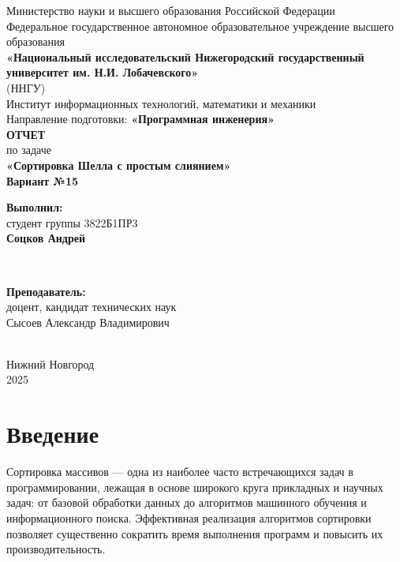 \documentclass[12pt]{article}
\begin{document}
\begin{titlepage}
    \centering
    \large
    Министерство науки и высшего образования Российской Федерации\\[0.5cm]
    Федеральное государственное автономное образовательное учреждение высшего образования\\[0.5cm]
    \textbf{«Национальный исследовательский Нижегородский государственный университет им. Н.И. Лобачевского»}\\
    (ННГУ)\\[1cm]
    Институт информационных технологий, математики и механики\\[0.5cm]
    Направление подготовки: \textbf{«Программная инженерия»}\\[2cm]

    \vfill
    {\LARGE \textbf{ОТЧЕТ}}\\[0.5cm]
    {\Large по задаче}\\[0.5cm]
    {\LARGE \textbf{«Сортировка Шелла с простым слиянием»}}\\[0.5cm]
    {\Large \textbf{Вариант №15}}\\[2.5cm]

    \hfill\parbox{0.5\textwidth}{
        \textbf{Выполнил:} \\
        студент группы 3822Б1ПР3 \\
        \textbf{Соцков Андрей}
    }\\[0.5cm]

    \hfill\parbox{0.5\textwidth}{
        \textbf{Преподаватель:} \\
        доцент, кандидат технических наук \\
        Сысоев Александр Владимирович
    }\\[2cm]

    Нижний Новгород\\
    2025
\end{titlepage}


\thispagestyle{empty}
\clearpage
{} 
\setcounter{page}{2} 
\tableofcontents
\clearpage
\setcounter{page}{3} 
\section{Введение}

\hspace*{1.25em}Сортировка массивов — одна из наиболее часто встречающихся задач в программировании, лежащая в основе широкого круга прикладных и научных задач: от базовой обработки данных до алгоритмов машинного обучения и информационного поиска. Эффективная реализация алгоритмов сортировки позволяет существенно сократить время выполнения программ и повысить их производительность.
\end{document}
